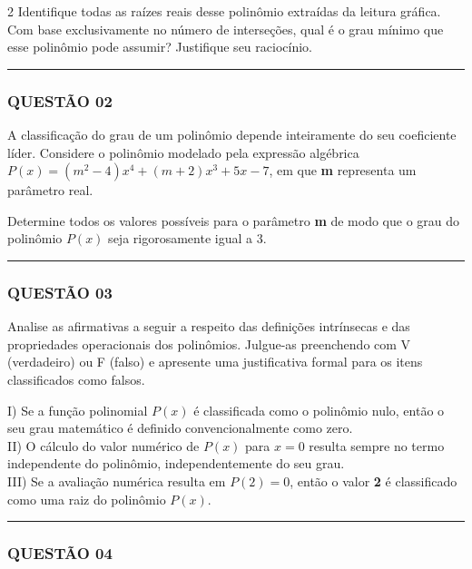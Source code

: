 \documentclass[11pt, a4paper]{article}
\begin{document}
\begin{multicols*}{2}
Identifique todas as raízes reais desse polinômio extraídas da leitura gráfica. Com base exclusivamente no número de interseções, qual é o grau mínimo que esse polinômio pode assumir? Justifique seu raciocínio.

\vspace{0cm} \noindent\textcolor{CorLinha}{\rule{\linewidth}{0.5pt}} \vspace{-0.2cm}
\subsubsection*{QUESTÃO 02}

A classificação do grau de um polinômio depende inteiramente do seu coeficiente líder. Considere o polinômio modelado pela expressão algébrica $ P(x) = (m^2 - 4)x^4 + (m + 2)x^3 + 5x - 7 $, em que \textbf{m} representa um parâmetro real.

Determine todos os valores possíveis para o parâmetro \textbf{m} de modo que o grau do polinômio $ P(x) $ seja rigorosamente igual a 3.

\vspace{0cm} \noindent\textcolor{CorLinha}{\rule{\linewidth}{0.5pt}} \vspace{-0.2cm}
\subsubsection*{QUESTÃO 03}

Analise as afirmativas a seguir a respeito das definições intrínsecas e das propriedades operacionais dos polinômios. Julgue-as preenchendo com V (verdadeiro) ou F (falso) e apresente uma justificativa formal para os itens classificados como falsos.

I) Se a função polinomial $ P(x) $ é classificada como o polinômio nulo, então o seu grau matemático é definido convencionalmente como zero.\\[0.3cm]
II) O cálculo do valor numérico de $ P(x) $ para $ x = 0 $ resulta sempre no termo independente do polinômio, independentemente do seu grau.\\[0.3cm]
III) Se a avaliação numérica resulta em $ P(2) = 0 $, então o valor \textbf{2} é classificado como uma raiz do polinômio $ P(x) $.

\vspace{0cm} \noindent\textcolor{CorLinha}{\rule{\linewidth}{0.5pt}} \vspace{-0.2cm}
\subsubsection*{QUESTÃO 04}


\end{multicols*}
\end{document}
